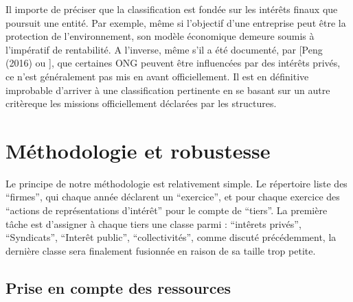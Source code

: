 \documentclass[a4paper,12pt]{article}
\begin{document}
Il importe de préciser que la classification est fondée sur les intérêts finaux que poursuit une entité. Par exemple, même si l'objectif d'une entreprise peut être la protection de l'environnement, son modèle économique demeure soumis à l'impératif de rentabilité. A l'inverse, m\^eme s'il a  été documenté, par [Peng (2016) ou \cite{BBT}], que certaines ONG peuvent être influencées par des intérêts privés, ce n'est généralement pas mis en avant officiellement. Il est en définitive improbable d'arriver à une classification pertinente en se basant sur un autre critèreque les missions officiellement déclarées par les structures. 


\section{Méthodologie et robustesse}


Le principe de notre méthodologie est relativement simple. Le répertoire liste des “firmes”, qui chaque année déclarent un “exercice”, et pour chaque exercice des “actions de représentations d’intérêt” pour le compte de “tiers”. La première tâche est d’assigner à chaque tiers une classe parmi : 
“intêrets privés”,
“Syndicats”,
“Interêt public”, ``collectivités'', comme discuté précédemment, la dernière classe sera finalement fusionnée en raison de sa taille trop petite. \\



\subsection{  Prise en compte des ressources}
\end{document}
